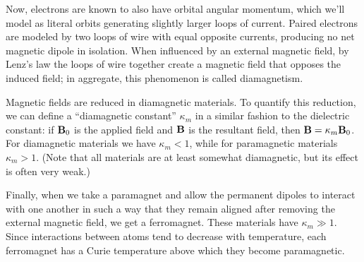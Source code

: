 \documentclass[../p051main.tex]{subfiles}
\begin{document}
Now, electrons are known to also have orbital angular momentum, which we'll model as literal orbits generating slightly larger loops of current.
Paired electrons are modeled by two loops of wire with equal opposite currents, producing no net magnetic dipole in isolation.
When influenced by an external magnetic field, by Lenz's law the loops of wire together create a magnetic field that opposes the induced field; in aggregate, this phenomenon is called diamagnetism.

Magnetic fields are reduced in diamagnetic materials.
To quantify this reduction, we can define a ``diamagnetic constant'' $\kappa_m$ in a similar fashion to the dielectric constant: if $\mathbf{B}_0$ is the applied field and $\mathbf{B}$ is the resultant field, then $\mathbf{B} = \kappa_m \mathbf{B}_0$.
For diamagnetic materials we have $\kappa_m < 1$, while for paramagnetic materials $\kappa_m > 1$.
(Note that all materials are at least somewhat diamagnetic, but its effect is often very weak.)

Finally, when we take a paramagnet and allow the permanent dipoles to interact with one another in such a way that they remain aligned after removing the external magnetic field, we get a ferromagnet.
These materials have $\kappa_m \gg 1$.
Since interactions between atoms tend to decrease with temperature, each ferromagnet has a Curie temperature above which they become paramagnetic.
\end{document}
